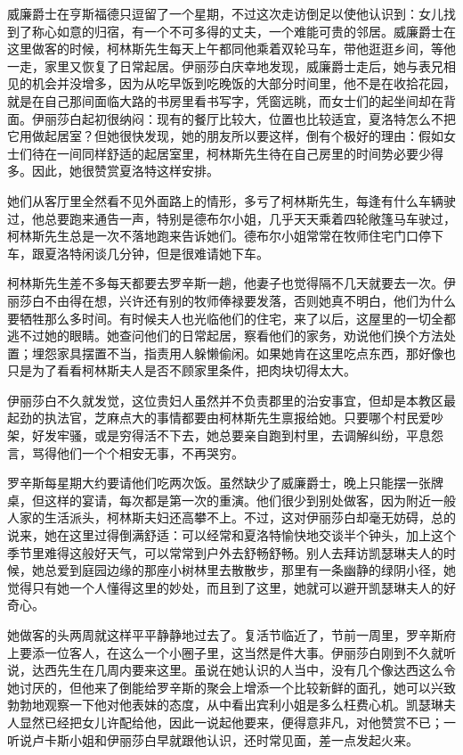 \par 威廉爵士在亨斯福德只逗留了一个星期，不过这次走访倒足以使他认识到：女儿找到了称心如意的归宿，有一个不可多得的丈夫，一个难能可贵的邻居。威廉爵士在这里做客的时候，柯林斯先生每天上午都同他乘着双轮马车，带他逛逛乡间，等他一走，家里又恢复了日常起居。伊丽莎白庆幸地发现，威廉爵士走后，她与表兄相见的机会并没增多，因为从吃早饭到吃晚饭的大部分时间里，他不是在收拾花园，就是在自己那间面临大路的书房里看书写字，凭窗远眺，而女士们的起坐间却在背面。伊丽莎白起初很纳闷：现有的餐厅比较大，位置也比较适宜，夏洛特怎么不把它用做起居室？但她很快发现，她的朋友所以要这样，倒有个极好的理由：假如女士们待在一间同样舒适的起居室里，柯林斯先生待在自己房里的时间势必要少得多。因此，她很赞赏夏洛特这样安排。
\par 她们从客厅里全然看不见外面路上的情形，多亏了柯林斯先生，每逢有什么车辆驶过，他总要跑来通告一声，特别是德布尔小姐，几乎天天乘着四轮敞篷马车驶过，柯林斯先生总是一次不落地跑来告诉她们。德布尔小姐常常在牧师住宅门口停下车，跟夏洛特闲谈几分钟，但是很难请她下车。
\par 柯林斯先生差不多每天都要去罗辛斯一趟，他妻子也觉得隔不几天就要去一次。伊丽莎白不由得在想，兴许还有别的牧师俸禄要发落，否则她真不明白，他们为什么要牺牲那么多时间。有时候夫人也光临他们的住宅，来了以后，这屋里的一切全都逃不过她的眼睛。她查问他们的日常起居，察看他们的家务，劝说他们换个方法处置；埋怨家具摆置不当，指责用人躲懒偷闲。如果她肯在这里吃点东西，那好像也只是为了看看柯林斯夫人是否不顾家里条件，把肉块切得太大。
\par 伊丽莎白不久就发觉，这位贵妇人虽然并不负责郡里的治安事宜，但却是本教区最起劲的执法官，芝麻点大的事情都要由柯林斯先生禀报给她。只要哪个村民爱吵架，好发牢骚，或是穷得活不下去，她总要亲自跑到村里，去调解纠纷，平息怨言，骂得他们一个个相安无事，不再哭穷。
\par 罗辛斯每星期大约要请他们吃两次饭。虽然缺少了威廉爵士，晚上只能摆一张牌桌，但这样的宴请，每次都是第一次的重演。他们很少到别处做客，因为附近一般人家的生活派头，柯林斯夫妇还高攀不上。不过，这对伊丽莎白却毫无妨碍，总的说来，她在这里过得倒满舒适：可以经常和夏洛特愉快地交谈半个钟头，加上这个季节里难得这般好天气，可以常常到户外去舒畅舒畅。别人去拜访凯瑟琳夫人的时候，她总爱到庭园边缘的那座小树林里去散散步，那里有一条幽静的绿阴小径，她觉得只有她一个人懂得这里的妙处，而且到了这里，她就可以避开凯瑟琳夫人的好奇心。
\par 她做客的头两周就这样平平静静地过去了。复活节临近了，节前一周里，罗辛斯府上要添一位客人，在这么一个小圈子里，这当然是件大事。伊丽莎白刚到不久就听说，达西先生在几周内要来这里。虽说在她认识的人当中，没有几个像达西这么令她讨厌的，但他来了倒能给罗辛斯的聚会上增添一个比较新鲜的面孔，她可以兴致勃勃地观察一下他对他表妹的态度，从中看出宾利小姐是多么枉费心机。凯瑟琳夫人显然已经把女儿许配给他，因此一说起他要来，便得意非凡，对他赞赏不已；一听说卢卡斯小姐和伊丽莎白早就跟他认识，还时常见面，差一点发起火来。
